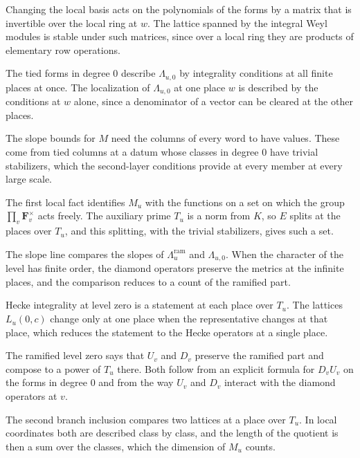 Changing the local basis acts on the polynomials of the forms by a matrix that
is invertible over the local ring at $w$. The lattice spanned by the integral
Weyl modules is stable under such matrices, since over a local ring they are
products of elementary row operations.

The tied forms in degree $0$ describe $\Lambda_{u,0}$ by integrality conditions
at all finite places at once. The localization of $\Lambda_{u,0}$ at one place
$w$ is described by the conditions at $w$ alone, since a denominator of a
vector can be cleared at the other places.

The slope bounds for $M$ need the columns of every word to have values. These
come from tied columns at a datum whose classes in degree $0$ have trivial
stabilizers, which the second-layer conditions provide at every member at
every large scale.

The first local fact identifies $M_u$ with the functions on a set on which the
group $\prod_v\mathbf F_v^\times$ acts freely. The auxiliary prime $T_u$ is a
norm from $K$, so $E$ splits at the places over $T_u$, and this splitting,
with the trivial stabilizers, gives such a set.

The slope line compares the slopes of $\Lambda^{\mathrm{ram}}_u$ and
$\Lambda_{u,0}$. When the character of the level has finite order, the diamond
operators preserve the metrics at the infinite places, and the comparison
reduces to a count of the ramified part.

Hecke integrality at level zero is a statement at each place over $T_u$. The
lattices $L_u(0,c)$ change only at one place when the representative changes
at that place, which reduces the statement to the Hecke operators at a single
place.

The ramified level zero says that $U_v$ and $D_v$ preserve the ramified part
and compose to a power of $T_u$ there. Both follow from an explicit formula for
$D_vU_v$ on the forms in degree $0$ and from the way $U_v$ and $D_v$ interact
with the diamond operators at $v$.

The second branch inclusion compares two lattices at a place over $T_u$. In
local coordinates both are described class by class, and the length of the
quotient is then a sum over the classes, which the dimension of $M_u$ counts.


